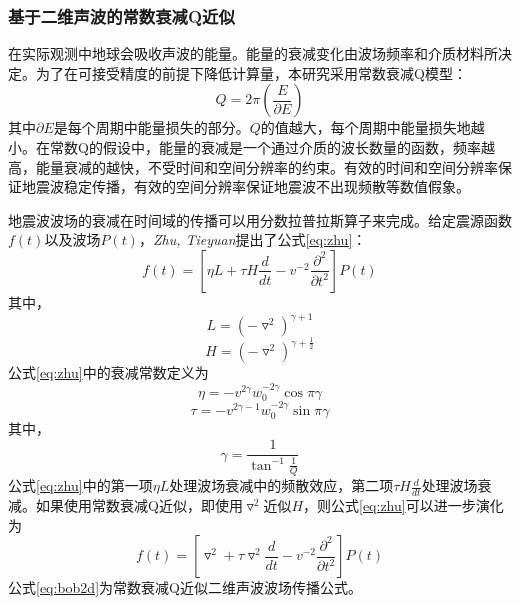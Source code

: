 \subsubsection{基于二维声波的常数衰减Q近似}
在实际观测中地球会吸收声波的能量。能量的衰减变化由波场频率和介质材料所决定。为了在可接受精度的前提下降低计算量，本研究采用常数衰减Q模型\cite{kjartansson1980attenuation}：
\begin{equation}
  Q = 2\pi(\frac{E}{\partial E})
\end{equation}
其中$\partial E$是每个周期中能量损失的部分。$Q$的值越大，每个周期中能量损失地越小。在常数Q的假设中，能量的衰减是一个通过介质的波长数量的函数，频率越高，能量衰减的越快，不受时间和空间分辨率的约束。有效的时间和空间分辨率保证地震波稳定传播，有效的空间分辨率保证地震波不出现频散等数值假象。

地震波波场的衰减在时间域的传播可以用分数拉普拉斯算子来完成\cite{zhu2014modeling}。给定震源函数$f(t)$以及波场$P(t)$，\emph{Zhu, Tieyuan}提出了公式\ref{eq:zhu}：
\begin{equation}
  f(t) = \left [ \eta L+\tau H\frac{d}{dt} -v^{-2} \frac{\partial ^2}{\partial t^2}\right ]P(t)
  \label{eq:zhu}
\end{equation}
其中，
\begin{equation}
  L = (-\triangledown ^2)^{\gamma + 1}
\end{equation}
\begin{equation}
  H = (-\triangledown ^2)^{\gamma + \frac{1}{2}}
\end{equation}
公式\ref{eq:zhu}中的衰减常数定义为
\begin{equation}
  \eta = -v^{2\gamma}w_0^{-2\gamma}\cos\pi\gamma
\end{equation}
\begin{equation}
  \tau = -v^{2\gamma-1}w_0^{-2\gamma}\sin\pi\gamma
\end{equation}
其中，
\begin{equation}
  \gamma = \frac{1}{\tan^{-1}\frac{1}{Q}}
\end{equation}
公式\ref{eq:zhu}中的第一项$\eta L$处理波场衰减中的频散效应，第二项$\tau H\frac{d}{dt}$处理波场衰减。如果使用常数衰减Q近似，即使用$\triangledown ^2$近似$H$，则公式\ref{eq:zhu}可以进一步演化为
\begin{equation}
  f(t) = \left [ \triangledown ^2 +\tau \triangledown ^2\frac{d}{dt} -v^{-2} \frac{\partial ^2}{\partial t^2}\right ]P(t)
  \label{eq:bob2d}
\end{equation}
公式\ref{eq:bob2d}为常数衰减Q近似二维声波波场传播公式。

